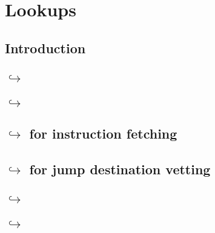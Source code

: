 

\section{Lookups \lispWip{}}
\subsection{Introduction}                                                                                                      \label{hub: lookups: intro}                                    
\subsection{\hubMod{} $\hookrightarrow$ \txnDataMod{}                                                       \lispDone      {}} \label{hub: lookups: into txnData}                             
\subsection{\hubMod{} $\hookrightarrow$ \rlpTxnMod{}                                                        \lispDone      {}} \label{hub: lookups: into rlpTxn}                              
\subsection{\hubMod{} $\hookrightarrow$ \romMod{} for instruction fetching                                  \lispDone      {}} \label{hub: lookups: into rom: instruction fetching}           
\subsection{\hubMod{} $\hookrightarrow$ \romMod{} for jump destination vetting                              \lispDone      {}} \label{hub: lookups: into rom: jump destination vetting}       
\subsection{\hubMod{} $\hookrightarrow$ \romLexMod{}                                                        \lispDone      {}} \label{hub: lookups: into romLex}                              
\subsection{\hubMod{} $\hookrightarrow$ \idMod{}                                                            \lispDone      {}} \label{hub: lookups: into instruction decoder}                 
